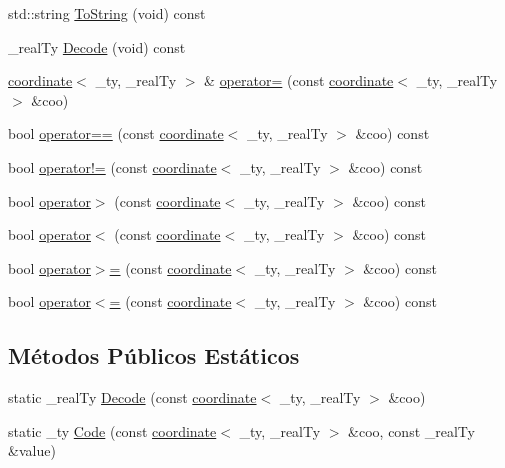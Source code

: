 \begin{DoxyCompactItemize}
std::string \hyperlink{classcoordinate_ae7277b9648c716a4ff6f16c15c26433d}{ToString} (void) const 
\item 
\_\-realTy \hyperlink{classcoordinate_a03f63a984d0b894f2056e3014eb570a3}{Decode} (void) const 
\item 
\hyperlink{classcoordinate}{coordinate}$<$ \_\-ty, \_\-realTy $>$ \& \hyperlink{classcoordinate_aeb156220bc0921767319774d77d0eb72}{operator=} (const \hyperlink{classcoordinate}{coordinate}$<$ \_\-ty, \_\-realTy $>$ \&coo)
\item 
bool \hyperlink{classcoordinate_a063671d1577abcf23a36af1c996ac26a}{operator==} (const \hyperlink{classcoordinate}{coordinate}$<$ \_\-ty, \_\-realTy $>$ \&coo) const 
\item 
bool \hyperlink{classcoordinate_a8254401d37f6be169cafb28ba10635c3}{operator!=} (const \hyperlink{classcoordinate}{coordinate}$<$ \_\-ty, \_\-realTy $>$ \&coo) const 
\item 
bool \hyperlink{classcoordinate_a9c19583af7069c444bef4a712ed7fc0c}{operator$>$} (const \hyperlink{classcoordinate}{coordinate}$<$ \_\-ty, \_\-realTy $>$ \&coo) const 
\item 
bool \hyperlink{classcoordinate_a052d4f0f28d416b72fe1b8ecccf80858}{operator$<$} (const \hyperlink{classcoordinate}{coordinate}$<$ \_\-ty, \_\-realTy $>$ \&coo) const 
\item 
bool \hyperlink{classcoordinate_a2b75371880389112fd471f596429fd23}{operator$>$=} (const \hyperlink{classcoordinate}{coordinate}$<$ \_\-ty, \_\-realTy $>$ \&coo) const 
\item 
bool \hyperlink{classcoordinate_a5c4a0543683ec8a6cbe751a075bd5187}{operator$<$=} (const \hyperlink{classcoordinate}{coordinate}$<$ \_\-ty, \_\-realTy $>$ \&coo) const 
\end{DoxyCompactItemize}
\subsection*{Métodos Públicos Estáticos}
\begin{DoxyCompactItemize}
\item 
static \_\-realTy \hyperlink{classcoordinate_a18260f8c8efb3e0b9e5cf8181569aa98}{Decode} (const \hyperlink{classcoordinate}{coordinate}$<$ \_\-ty, \_\-realTy $>$ \&coo)
\item 
static \_\-ty \hyperlink{classcoordinate_adac8246ca9452ff459e46e2d1b981466}{Code} (const \hyperlink{classcoordinate}{coordinate}$<$ \_\-ty, \_\-realTy $>$ \&coo, const \_\-realTy \&value)
\end{DoxyCompactItemize}
